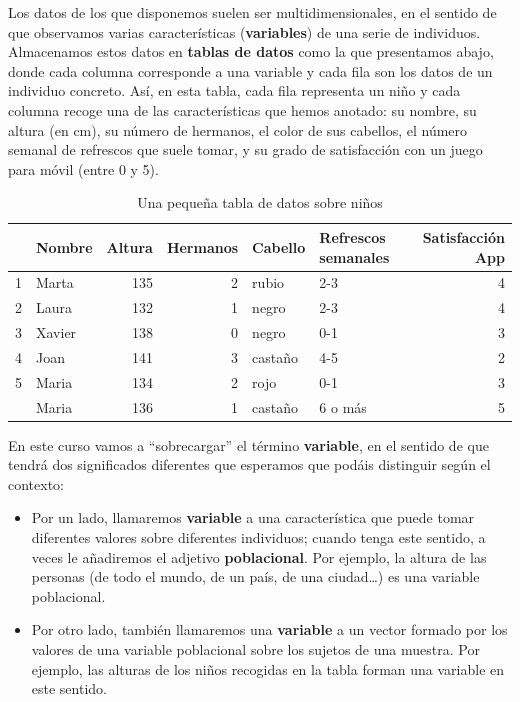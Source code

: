 \documentclass[
  letterpaper,
  DIV=11,
  numbers=noendperiod]{scrreprt}
\begin{document}
Los datos de los que disponemos suelen ser multidimensionales, en el
sentido de que observamos varias características (\textbf{variables}) de
una serie de individuos. Almacenamos estos datos en \textbf{tablas de
datos} como la que presentamos abajo, donde cada columna corresponde a
una variable y cada fila son los datos de un individuo concreto. Así, en
esta tabla, cada fila representa un niño y cada columna recoge una de
las características que hemos anotado: su nombre, su altura (en cm), su
número de hermanos, el color de sus cabellos, el número semanal de
refrescos que suele tomar, y su grado de satisfacción con un juego para
móvil (entre 0 y 5).

\begin{longtable}[t]{llrrllr}
\caption{\label{tab:tabla1}Una pequeña tabla de datos sobre niños}\\
\toprule
 & Nombre & Altura & Hermanos & Cabello & Refrescos semanales & Satisfacción App\\
\midrule
1 & Marta & 135 & 2 & rubio & 2-3 & 4\\
2 & Laura & 132 & 1 & negro & 2-3 & 4\\
3 & Xavier & 138 & 0 & negro & 0-1 & 3\\
4 & Joan & 141 & 3 & castaño & 4-5 & 2\\
5 & Maria & 134 & 2 & rojo & 0-1 & 3\\
\addlinespace
6 & Maria & 136 & 1 & castaño & 6 o más & 5\\
\bottomrule
\end{longtable}

\begin{tcolorbox}[enhanced jigsaw, opacityback=0, coltitle=black, colbacktitle=quarto-callout-caution-color!10!white, toprule=.15mm, colframe=quarto-callout-caution-color-frame, colback=white, opacitybacktitle=0.6, toptitle=1mm, bottomtitle=1mm, rightrule=.15mm, breakable, titlerule=0mm, arc=.35mm, left=2mm, title=\textcolor{quarto-callout-caution-color}{\faFire}\hspace{0.5em}{Precaución}, leftrule=.75mm, bottomrule=.15mm]

En este curso vamos a ``sobrecargar'' el término \textbf{variable}, en
el sentido de que tendrá dos significados diferentes que esperamos que
podáis distinguir según el contexto:

\begin{itemize}
\item
  Por un lado, llamaremos \textbf{variable} a una característica que
  puede tomar diferentes valores sobre diferentes individuos; cuando
  tenga este sentido, a veces le añadiremos el adjetivo
  \textbf{poblacional}. Por ejemplo, la altura de las personas (de todo
  el mundo, de un país, de una ciudad\ldots) es una variable
  poblacional.
\item
  Por otro lado, también llamaremos una \textbf{variable} a un vector
  formado por los valores de una variable poblacional sobre los sujetos
  de una muestra. Por ejemplo, las alturas de los niños recogidas en la
  tabla forman una variable en este sentido.
\end{itemize}

\end{tcolorbox}
\end{document}
